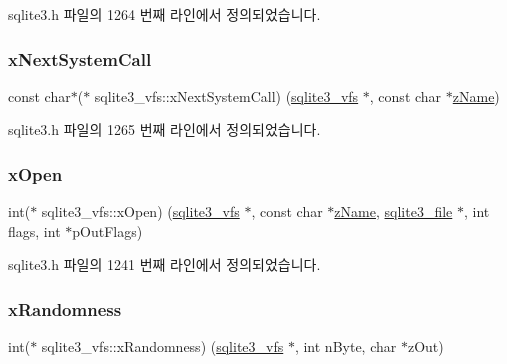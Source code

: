 sqlite3.\+h 파일의 1264 번째 라인에서 정의되었습니다.

\mbox{\label{structsqlite3__vfs_afbd158883d9bb7954fa7ecd595fe3c2b}} 
\subsubsection{\texorpdfstring{x\+Next\+System\+Call}{xNextSystemCall}}
{\footnotesize\ttfamily const char$\ast$($\ast$ sqlite3\+\_\+vfs\+::x\+Next\+System\+Call) (\hyperlink{structsqlite3__vfs}{sqlite3\+\_\+vfs} $\ast$, const char $\ast$\hyperlink{structsqlite3__vfs_a0f06a27ac2201ea04c0623ef19e5d73e}{z\+Name})}



sqlite3.\+h 파일의 1265 번째 라인에서 정의되었습니다.

\mbox{\label{structsqlite3__vfs_ab106b445eb5d372266a1108fc982a9aa}} 
\subsubsection{\texorpdfstring{x\+Open}{xOpen}}
{\footnotesize\ttfamily int($\ast$ sqlite3\+\_\+vfs\+::x\+Open) (\hyperlink{structsqlite3__vfs}{sqlite3\+\_\+vfs} $\ast$, const char $\ast$\hyperlink{structsqlite3__vfs_a0f06a27ac2201ea04c0623ef19e5d73e}{z\+Name}, \hyperlink{structsqlite3__file}{sqlite3\+\_\+file} $\ast$, int flags, int $\ast$p\+Out\+Flags)}



sqlite3.\+h 파일의 1241 번째 라인에서 정의되었습니다.

\mbox{\label{structsqlite3__vfs_ac74c20a91cbd440ed72b11de4c4333ea}} 
\subsubsection{\texorpdfstring{x\+Randomness}{xRandomness}}
{\footnotesize\ttfamily int($\ast$ sqlite3\+\_\+vfs\+::x\+Randomness) (\hyperlink{structsqlite3__vfs}{sqlite3\+\_\+vfs} $\ast$, int n\+Byte, char $\ast$z\+Out)}



